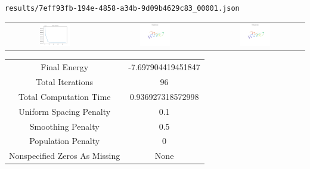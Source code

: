 \documentclass{report}
\begin{document}
\begin{lstlisting}
results/7eff93fb-194e-4858-a34b-9d09b4629c83_00001.json
\end{lstlisting}
\begin{tabular}{ccc}
\includegraphics[width=0.32\textwidth]{7eff93fb-194e-4858-a34b-9d09b4629c83_00001_energies.png}
&
\includegraphics[width=0.32\textwidth]{7eff93fb-194e-4858-a34b-9d09b4629c83_00001_initial_curves.png}
&
\includegraphics[width=0.32\textwidth]{7eff93fb-194e-4858-a34b-9d09b4629c83_00001_estimated_curves.png}
\\
\end{tabular}
\begin{tabular}{cc}
Final Energy&-7.697904419451847\\
Total Iterations&96\\
Total Computation Time&0.936927318572998\\
Uniform Spacing Penalty&0.1\\
Smoothing Penalty&0.5\\
Population Penalty&0\\
Nonspecified Zeros As Missing&None\\
\end{tabular}
\end{document}
